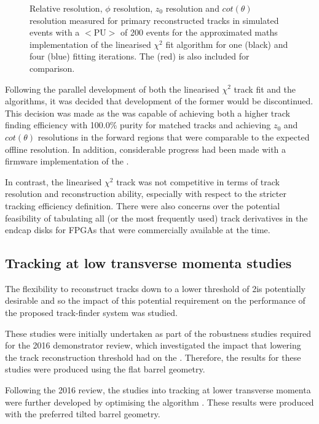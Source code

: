 \begin{figure}[htb]
\caption{
Relative \pt resolution, $\phi$ resolution, $z_{0}$ resolution and $cot(\theta)$ resolution measured for primary reconstructed tracks in simulated \ttbar events with a $<\textrm{PU}>$ of 200 events for the approximated maths implementation of the linearised $\chi^{2}$ fit algorithm for one (black) and four (blue) fitting iterations. The \KF (red) is also included for comparison.
}
\label{fig:chi2HelixParametersResIterationsComparison}
\end{figure}

Following the parallel development of both the linearised $\chi^{2}$ track fit and the \KF algorithms, it was decided that development of the former would be discontinued.
This decision was made as the \KF was capable of achieving both a higher track finding efficiency with 100.0\% purity for matched tracks and achieving $z_{0}$ and $cot(\theta)$ resolutions in the forward regions that were comparable to the expected offline resolution.
In addition, considerable progress had been made with a firmware implementation of the \KF.

In contrast, the linearised $\chi^{2}$ track was not competitive in terms of track resolution and reconstruction ability, especially with respect to the stricter tracking efficiency definition.
There were also concerns over the potential feasibility of tabulating all (or the most frequently used) track derivatives in the endcap disks for FPGAs that were commercially available at the time.

\subsection{Tracking at low transverse momenta studies}\label{subsec:Tmtt2GeV}
The flexibility to reconstruct tracks down to a lower \pT threshold of 2\GeV is potentially desirable and so the impact of this potential requirement on the performance of the proposed track-finder system was studied.

These studies were initially undertaken as part of the robustness studies required for the 2016 demonstrator review, which investigated the impact that lowering the track reconstruction \pT threshold had on the \HT.
Therefore, the results for these studies were produced using the flat barrel geometry.

Following the 2016 review, the studies into tracking at lower transverse momenta were further developed by optimising the \KF algorithm .
These results were produced with the preferred tilted barrel geometry.

